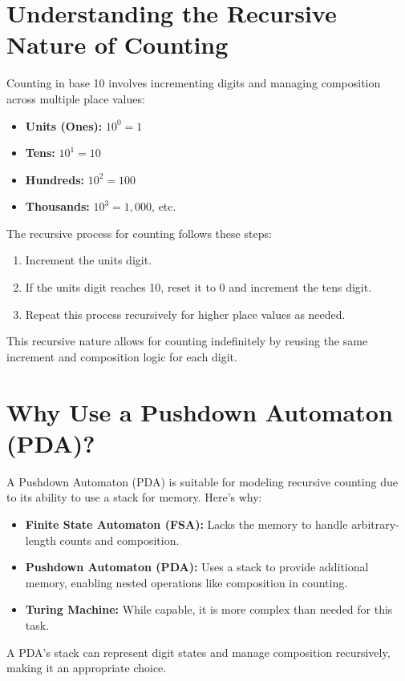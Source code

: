 \documentclass[11pt]{article}
\begin{document}
\section{Understanding the Recursive Nature of Counting}

Counting in base 10 involves incrementing digits and managing composition across multiple place values:
\begin{itemize}
    \item \textbf{Units (Ones):} $10^0 = 1$
    \item \textbf{Tens:} $10^1 = 10$
    \item \textbf{Hundreds:} $10^2 = 100$
    \item \textbf{Thousands:} $10^3 = 1,000$, etc.
\end{itemize}

The recursive process for counting follows these steps:
\begin{enumerate}
    \item Increment the units digit.
    \item If the units digit reaches 10, reset it to 0 and increment the tens digit.
    \item Repeat this process recursively for higher place values as needed.
\end{enumerate}

This recursive nature allows for counting indefinitely by reusing the same increment and composition logic for each digit.

\section{Why Use a Pushdown Automaton (PDA)?}

A Pushdown Automaton (PDA) is suitable for modeling recursive counting due to its ability to use a stack for memory. Here's why:
\begin{itemize}
    \item \textbf{Finite State Automaton (FSA):} Lacks the memory to handle arbitrary-length counts and composition.
    \item \textbf{Pushdown Automaton (PDA):} Uses a stack to provide additional memory, enabling nested operations like composition in counting.
    \item \textbf{Turing Machine:} While capable, it is more complex than needed for this task.
\end{itemize}

A PDA's stack can represent digit states and manage composition recursively, making it an appropriate choice.
\end{document}
